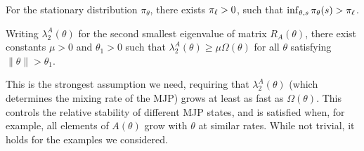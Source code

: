 \begin{assumption}
For the stationary distribution $\pi_\theta$, there exists $\pi_\ell > 0$, such that $\inf_{\theta, s} \pi_{\theta}(s) > \pi_\ell$.
\label{asmp:stationary_dist_lower_bound}
\end{assumption}
\begin{assumption}
	Writing $\lambda ^A_2(\theta)$ for the second smallest eigenvalue of
    matrix  $R_A(\theta)$, there exist constants $\mu > 0$ and $\theta_1 > 0$
    such that $ \lambda ^A_2(\theta) \geq \mu \Omega(\theta)$
   for all $\theta$ satisfying $ \| \theta \|> \theta_1$.
  \label{asmp:cond_num}
\end{assumption} 
\noindent %
This is the strongest assumption we need, requiring that 
$\lambda^A_2(\theta)$ (which determines the mixing rate of the MJP) grows 
at least as fast as $\Omega(\theta)$. 
This controls the relative stability of different MJP states, and is 
satisfied when, for example, all elements of $A(\theta)$ grow with 
$\theta$ at similar rates.
While not trivial, it holds for the examples we 
considered. %
